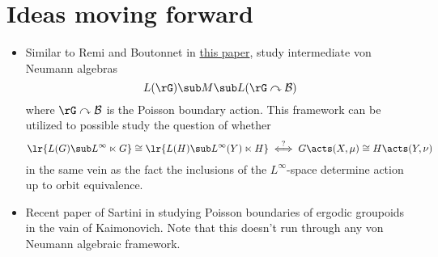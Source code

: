 \documentclass[../main.tex]{subfiles}
\begin{document}
\section{Ideas moving forward}

\begin{itemize}
    \item Similar to Remi and Boutonnet in \href{https://arxiv.org/pdf/2207.13548.pdf}{this paper}, study intermediate von Neumann algebras
        \[
            L(\rG) \sub M \sub L(\rG \curvearrowright \mathcal{B})
        \]
        where $\rG \curvearrowright \mathcal{B} $ is the Poisson boundary action. This framework can be utilized to possible study the question of whether
        \[
            \lr{L(G)\sub L^{\infty}\ltimes G} \cong \lr{L(H) \sub L^{\infty}(Y) \ltimes H} \overset{?}{\iff} G\acts(X,\mu) \cong H\acts(Y,\nu)
        \]
        in the same vein as the fact the inclusions of the $ L^\infty $-space determine action up to orbit equivalence.

    \item Recent paper of Sartini in \cite{sartini:24} studying Poisson boundaries of ergodic groupoids in the vain of Kaimonovich. Note that this doesn't run through any von Neumann algebraic framework.
\end{itemize}
\end{document}
